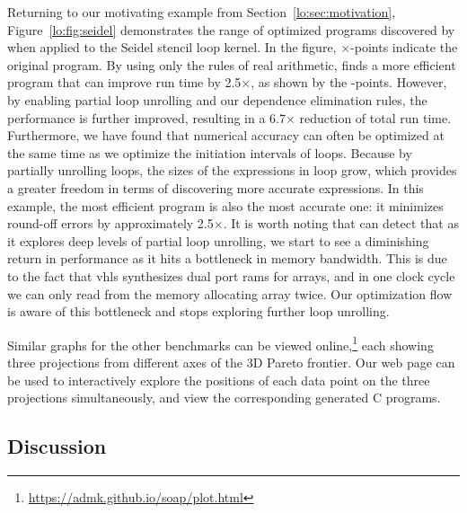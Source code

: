 Returning to our motivating example from Section~\ref{lo:sec:motivation},
Figure~\ref{lo:fig:seidel} demonstrates the range of optimized programs
discovered by \soap{} when applied to the Seidel stencil loop kernel. In
the figure, $\times$-points indicate the original program. By using only
the rules of real arithmetic, \soap{} finds a more efficient program that
can improve run time by 2.5$\times$, as shown by the -points. However, by enabling partial loop unrolling and our
dependence elimination rules, the performance is further improved, resulting
in a 6.7$\times$ reduction of total run time.  Furthermore, we have found that
numerical accuracy can often be optimized at the same time as we optimize the
initiation intervals of loops. Because by partially unrolling loops, the sizes
of the expressions in loop grow, which provides \soap{} a greater freedom in
terms of discovering more accurate expressions. In this example, the most
efficient program is also the most accurate one: it minimizes round-off errors
by approximately 2.5$\times$. It is worth noting that \soap{} can detect
that as it explores deep levels of partial loop unrolling, we start to see a
diminishing return in performance as it hits a bottleneck in memory bandwidth.
This is due to the fact that \gls{vhls} synthesizes dual port \glspl{ram} for
arrays, and in one clock cycle we can only read from the memory allocating
array twice.  Our optimization flow is aware of this bottleneck and stops
exploring further loop unrolling.

Similar graphs for the other benchmarks can be viewed
online,\footnote{\url{https://admk.github.io/soap/plot.html}} each showing
three projections from different axes of the 3D Pareto frontier. Our web page
can be used to interactively explore the positions of each data point on the
three projections simultaneously, and view the corresponding generated C
programs.

\subsection{Discussion}
\label{lo:sub:discussion}

